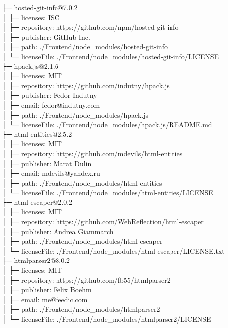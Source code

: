 ├─ hosted-git-info@7.0.2\\
│  ├─ licenses: ISC\\
│  ├─ repository: https://github.com/npm/hosted-git-info\\
│  ├─ publisher: GitHub Inc.\\
│  ├─ path: ./Frontend/node\_modules/hosted-git-info\\
│  └─ licenseFile: ./Frontend/node\_modules/hosted-git-info/LICENSE\\
├─ hpack.js@2.1.6\\
│  ├─ licenses: MIT\\
│  ├─ repository: https://github.com/indutny/hpack.js\\
│  ├─ publisher: Fedor Indutny\\
│  ├─ email: fedor@indutny.com\\
│  ├─ path: ./Frontend/node\_modules/hpack.js\\
│  └─ licenseFile: ./Frontend/node\_modules/hpack.js/README.md\\
├─ html-entities@2.5.2\\
│  ├─ licenses: MIT\\
│  ├─ repository: https://github.com/mdevils/html-entities\\
│  ├─ publisher: Marat Dulin\\
│  ├─ email: mdevils@yandex.ru\\
│  ├─ path: ./Frontend/node\_modules/html-entities\\
│  └─ licenseFile: ./Frontend/node\_modules/html-entities/LICENSE\\
├─ html-escaper@2.0.2\\
│  ├─ licenses: MIT\\
│  ├─ repository: https://github.com/WebReflection/html-escaper\\
│  ├─ publisher: Andrea Giammarchi\\
│  ├─ path: ./Frontend/node\_modules/html-escaper\\
│  └─ licenseFile: ./Frontend/node\_modules/html-escaper/LICENSE.txt\\
├─ htmlparser2@8.0.2\\
│  ├─ licenses: MIT\\
│  ├─ repository: https://github.com/fb55/htmlparser2\\
│  ├─ publisher: Felix Boehm\\
│  ├─ email: me@feedic.com\\
│  ├─ path: ./Frontend/node\_modules/htmlparser2\\
│  └─ licenseFile: ./Frontend/node\_modules/htmlparser2/LICENSE\\
